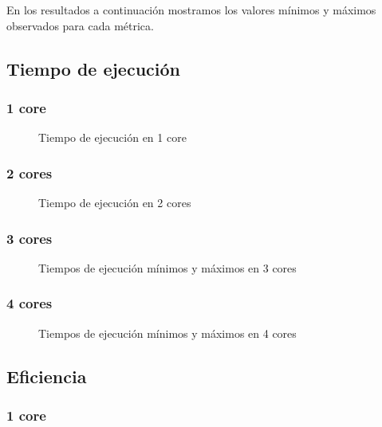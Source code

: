 \documentclass[a4paper,10pt,twoside]{article}
\begin{document}
En los resultados a continuación mostramos los valores mínimos y máximos observados para cada métrica.


\subsection{Tiempo de ejecución}


\subsubsection{1 core}

\begin{figure}[H]
	\centering
	
	\caption{Tiempo de ejecución en 1 core}
\end{figure}


\subsubsection{2 cores}

\begin{figure}[H]
	\centering
	
	\caption{Tiempo de ejecución en 2 cores}
\end{figure}


\subsubsection{3 cores}

\begin{figure}[H]
	\centering
	
	\caption{Tiempos de ejecución mínimos y máximos en 3 cores}
\end{figure}


\subsubsection{4 cores}

\begin{figure}[H]
	\centering
	
	\caption{Tiempos de ejecución mínimos y máximos en 4 cores}
\end{figure}


\subsection{Eficiencia}


\subsubsection{1 core}
\end{document}
